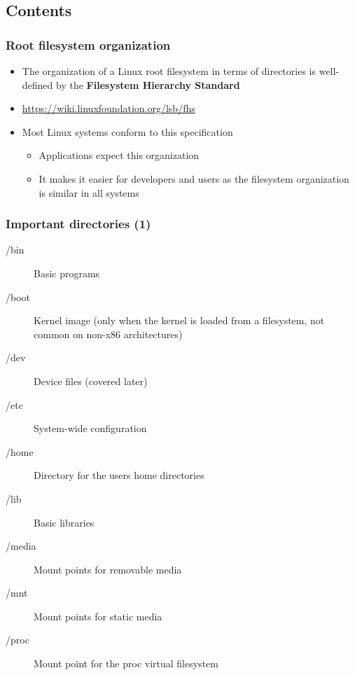 \subsection{Contents}

\begin{frame}
  \frametitle{Root filesystem organization}
  \begin{itemize}
  \item The organization of a Linux root filesystem in terms of
    directories is well-defined by the {\bf Filesystem Hierarchy
      Standard}
  \item \url{https://wiki.linuxfoundation.org/lsb/fhs}
  \item Most Linux systems conform to this specification
    \begin{itemize}
    \item Applications expect this organization
    \item It makes it easier for developers and users as the
      filesystem organization is similar in all systems
    \end{itemize}
  \end{itemize}
\end{frame}

\begin{frame}
  \frametitle{Important directories (1)}
  \begin{description}
  \item[/bin] Basic programs
  \item[/boot] Kernel image (only when the kernel is loaded from a
    filesystem, not common on non-x86 architectures)
  \item[/dev] Device files (covered later)
  \item[/etc] System-wide configuration
  \item[/home] Directory for the users home directories
  \item[/lib] Basic libraries
  \item[/media] Mount points for removable media
  \item[/mnt] Mount points for static media
  \item[/proc] Mount point for the proc virtual filesystem
  \end{description}
\end{frame}

